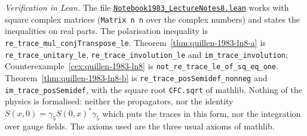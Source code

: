 \emph{Verification in Lean.} The file \href{\leanblobmain/Notebook1983_LectureNotes8.lean}{\texttt{Notebook1983\_\allowbreak{}LectureNotes8.\allowbreak{}lean}} works with square complex matrices (\texttt{Matrix n n} over the complex numbers) and states the inequalities on real parts. The polarisation inequality is \texttt{re\_trace\_mul\_conjTranspose\_le}. Theorem~\ref{thm:quillen-1983-ln8-a} is \texttt{re\_trace\_unitary\_le}, \texttt{re\_trace\_involution\_le} and \texttt{im\_trace\_involution}; Counterexample~\ref{cex:quillen-1983-ln8} is \texttt{not\_re\_trace\_le\_of\_sq\_eq\_one}. Theorem~\ref{thm:quillen-1983-ln8-b} is \texttt{re\_trace\_posSemidef\_nonneg} and \texttt{im\_trace\_posSemidef}, with the square root \texttt{CFC.sqrt} of mathlib. Nothing of the physics is formalised: neither the propagators, nor the identity $S(x, 0) = \gamma_5 S(0, x)^*\gamma_5$ which puts the traces in this form, nor the integration over gauge fields. The axioms used are the three usual axioms of mathlib.

